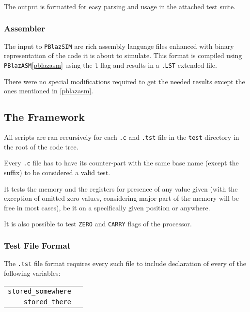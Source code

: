                 The output is formatted for easy parsing and usage in the attached test suite.

            \subsubsection{Assembler}

                The input to \texttt{PBlazSIM} are rich assembly language files enhanced with binary representation of the code it is about to simulate. This format is compiled using \texttt{PBlazASM}\ref{pblazasm} using the \texttt{\-l} flag and results in a \texttt{.LST} extended file.

                There were no special modifications required to get the needed results except the ones mentioned in \ref{pblazasm}.

        \subsection{The Framework}

        All scripts are ran recursively for each \texttt{.c} and \texttt{.tst} file in the \texttt{test} directory in the root of the code tree.

        Every \texttt{.c} file has to have its counter-part with the same base name (except the suffix) to be considered a valid test.

        It tests the memory and the registers for presence of any value given (with the exception of omitted zero values, considering major part of the memory will be free in most cases), be it on a specifically given position or anywhere.

        It is also possible to test \texttt{ZERO} and \texttt{CARRY} flags of the processor.

            \subsubsection{Test File Format}

            The \texttt{.tst} file format requires every such file to include declaration of every of the following variables:

            \begin{center}
            \begin{tabular}{ r | l }
                \texttt{stored\_somewhere} & \todo{...}\\

                \texttt{stored\_there} & \todo{...}\\

            \end{tabular}
            \end{center}

